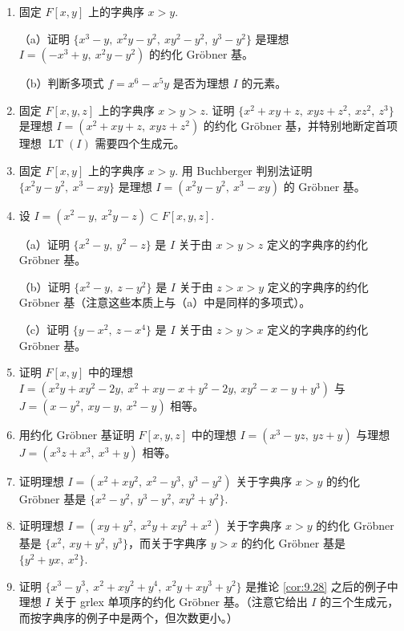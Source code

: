\begin{enumerate}
\item 固定 \(F[x, y]\) 上的字典序 \(x > y\).

（a）证明 \(\{x^3-y,\ x^2y-y^2,\ xy^2-y^2,\ y^3-y^2\}\) 是理想 \(I = (-x^3+y,\ x^2y-y^2)\) 的约化 Gröbner 基。

（b）判断多项式 \(f = x^6-x^5y\) 是否为理想 \(I\) 的元素。

\item 固定 \(F[x, y, z]\) 上的字典序 \(x > y > z\). 证明 \(\{x^2+xy+z,\ xyz+z^2,\ xz^2,\ z^3\}\) 是理想 \(I = (x^2+xy+z,\ xyz+z^2)\) 的约化 Gröbner 基，并特别地断定首项理想 \(\operatorname{LT}(I)\) 需要四个生成元。

\item 固定 \(F[x, y]\) 上的字典序 \(x > y\). 用 Buchberger 判别法证明 \(\{x^2y-y^2,\ x^3-xy\}\) 是理想 \(I = (x^2y-y^2,\ x^3-xy)\) 的 Gröbner 基。

\item 设 \(I = (x^2-y,\ x^2y-z) \subset F[x, y, z]\).

（a）证明 \(\{x^2-y,\ y^2-z\}\) 是 \(I\) 关于由 \(x > y > z\) 定义的字典序的约化 Gröbner 基。

（b）证明 \(\{x^2-y,\ z-y^2\}\) 是 \(I\) 关于由 \(z > x > y\) 定义的字典序的约化 Gröbner 基（注意这些本质上与（a）中是同样的多项式）。

（c）证明 \(\{y-x^2,\ z-x^4\}\) 是 \(I\) 关于由 \(z > y > x\) 定义的字典序的约化 Gröbner 基。

\item 证明 \(F[x, y]\) 中的理想 \(I = (x^2y+xy^2-2y,\ x^2+xy-x+y^2-2y,\ xy^2-x-y+y^3)\) 与 \(J = (x-y^2,\ xy-y,\ x^2-y)\) 相等。

\item 用约化 Gröbner 基证明 \(F[x, y, z]\) 中的理想 \(I = (x^3-yz,\ yz+y)\) 与理想 \(J = (x^3z+x^3,\ x^3+y)\) 相等。

\item 证明理想 \(I = (x^2+xy^2,\ x^2-y^3,\ y^3-y^2)\) 关于字典序 \(x > y\) 的约化 Gröbner 基是 \(\{x^2-y^2,\ y^3-y^2,\ xy^2+y^2\}\).

\item 证明理想 \(I = (xy+y^2,\ x^2y+xy^2+x^2)\) 关于字典序 \(x > y\) 的约化 Gröbner 基是 \(\{x^2,\ xy+y^2,\ y^3\}\)，而关于字典序 \(y > x\) 的约化 Gröbner 基是 \(\{y^2+yx,\ x^2\}\).

\item 证明 \(\{x^3-y^3,\ x^2+xy^2+y^4,\ x^2y+xy^3+y^2\}\) 是推论 \ref{cor:9.28} 之后的例子中理想 \(I\) 关于 grlex 单项序的约化 Gröbner 基。（注意它给出 \(I\) 的三个生成元，而按字典序的例子中是两个，但次数更小。）


\end{enumerate}
